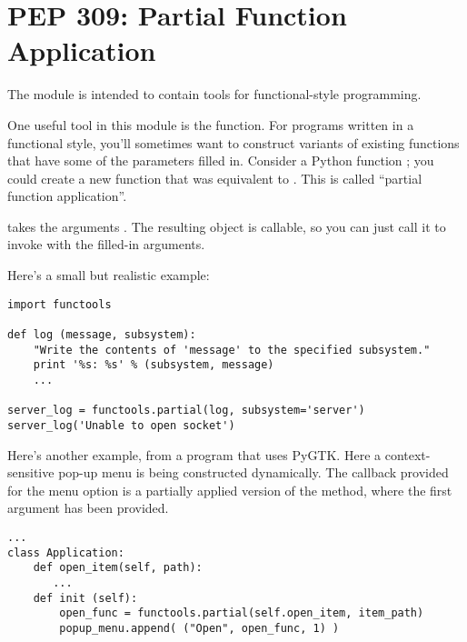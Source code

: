 \documentclass{howto}
\begin{document}
\begin{seealso}


\end{seealso}


\section{PEP 309: Partial Function Application\label{pep-309}}

The  module is intended to contain tools for
functional-style programming.  

One useful tool in this module is the  function.
For programs written in a functional style, you'll sometimes want to
construct variants of existing functions that have some of the
parameters filled in.  Consider a Python function ;
you could create a new function  that was equivalent to
.  This is called ``partial function application''.

 takes the arguments
.  The resulting
object is callable, so you can just call it to invoke 
with the filled-in arguments.

Here's a small but realistic example:

\begin{verbatim}
import functools

def log (message, subsystem):
    "Write the contents of 'message' to the specified subsystem."
    print '%s: %s' % (subsystem, message)
    ...

server_log = functools.partial(log, subsystem='server')
server_log('Unable to open socket')
\end{verbatim}

Here's another example, from a program that uses PyGTK.  Here a
context-sensitive pop-up menu is being constructed dynamically.  The
callback provided for the menu option is a partially applied version
of the  method, where the first argument has been
provided.

\begin{verbatim}
...
class Application:
    def open_item(self, path):
       ...
    def init (self):
        open_func = functools.partial(self.open_item, item_path)
        popup_menu.append( ("Open", open_func, 1) )
\end{verbatim}
\end{document}
